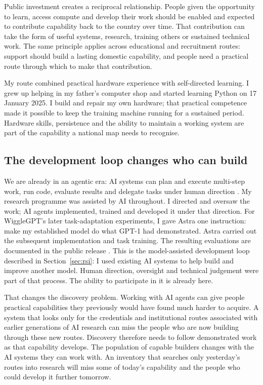 \documentclass[11pt,a4paper]{article}
\begin{document}
Public investment creates a reciprocal relationship. People given the
opportunity to learn, access compute and develop their work should be
enabled and expected to contribute capability back to the country over
time. That contribution can take the form of useful systems, research,
training others or sustained technical work. The same principle applies
across educational and recruitment routes: support should build a lasting
domestic capability, and people need a practical route through which to
make that contribution.

My route combined practical hardware experience with self-directed
learning. I grew up helping in my father's computer shop and started
learning Python on 17 January 2025. I build and repair my own hardware;
that practical competence made it possible to keep the training machine
running for a sustained period. Hardware skills, persistence and the
ability to maintain a working system are part of the capability a national
map needs to recognise.

\subsection{The development loop changes who can build}
We are already in an agentic era: AI systems can plan and execute multi-step
work, run code, evaluate results and delegate tasks under human direction
\cite{anthropicrsi2026}.
My research programme was assisted by AI throughout. I directed and
oversaw the work; AI agents implemented, trained and developed it under
that direction. For WiggleGPT's later task-adaptation experiments, I gave
Astra one instruction: make my established model do what GPT-1 had
demonstrated. Astra carried out the subsequent implementation and task
training. The resulting evaluations are documented in the public release
\cite{wigglecard}.
This is the model-assisted development loop described in
Section~\ref{sec:rsi}: I used existing AI systems to help build and improve
another model. Human direction, oversight and technical judgement were
part of that process. The ability to participate in it is already here.

That changes the discovery problem. Working with AI agents can give people practical
capabilities they previously would have found much harder to acquire.
A system that looks only for the credentials and institutional routes
associated with earlier generations of AI research can miss the people
who are now building through these new routes. Discovery therefore needs
to follow demonstrated work as that capability develops. The population
of capable builders changes with the AI systems they can work with. An inventory
that searches only yesterday's routes into research will miss some of
today's capability and the people who could develop it further tomorrow.
\end{document}
